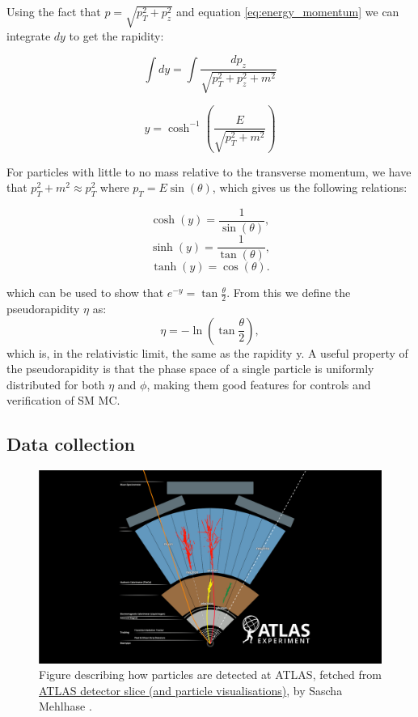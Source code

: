 Using the fact that $p = \sqrt{p_T^2 + p_z^2}$ and equation \ref{eq:energy_momentum} we can integrate $dy$ to get the rapidity:

\begin{equation*}
    \int dy = \int \frac{dp_z}{\sqrt{p_T^2 + p_z^2 + m^2}}
\end{equation*}

\begin{equation}
    y = \cosh^{-1}\left( \frac{E}{\sqrt{p_T^2 + m^2}}\right)
\end{equation}

For particles with little to no mass relative to the transverse momentum, we have that $p_T^2 + m^2 \approx p_T^2$ 
where $p_T = E\sin{(\theta)}$, which gives us the following relations:

\begin{equation*}
    \cosh(y) = \frac{1}{\sin(\theta)},
\end{equation*}
\begin{equation*}
    \sinh(y) = \frac{1}{\tan(\theta)},
\end{equation*}
\begin{equation*}
    \tanh(y) = \cos(\theta).
\end{equation*}

which can be used to show that $e^{-y} = \tan{\frac{\theta}{2}}$. From this we define the pseudorapidity $\eta$ as:
\begin{equation}
    \eta = -\ln{\left( \tan{\frac{\theta}{2}}\right)},
\end{equation}
which is, in the relativistic limit, the same as the rapidity y. A useful property of the pseudorapidity is that 
the phase space of a single particle is uniformly distributed for both $\eta$ and $\phi$, making them good features 
for controls and verification of SM MC. 
\subsection*{Data collection}

\begin{figure}[H]
    \includegraphics[width=\linewidth]{Figures/atlas/ATLAS Detector Schematic black particles.png}
    \caption[Detector tracking of particles]{Figure describing how particles are detected at ATLAS, fetched from \href{https://cds.cern.ch/record/2770815}{	ATLAS detector slice (and particle visualisations)}, by Sascha Mehlhase \cite{Mehlhase:2770815} . }
    \label{fig:atlas_particle_detect}
\end{figure}

